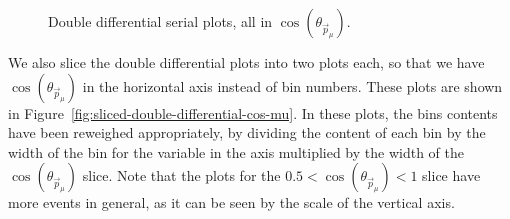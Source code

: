 \documentclass{article}
\begin{document}
\begin{figure}[H]
    \caption{Double differential serial plots, all in $\cos(\theta_{\vec{p}_{\mu}})$.}
    \label{fig:double-differential-cos-mu}
\end{figure}

We also slice the double differential plots into two plots each, so that we have $\cos(\theta_{\vec{p}_{\mu}})$ in the horizontal axis instead of bin numbers. These plots are shown in Figure~\ref{fig:sliced-double-differential-cos-mu}. In these plots, the bins contents have been reweighed appropriately, by dividing the content of each bin by the width of the bin for the variable in the axis multiplied by the width of the $\cos(\theta_{\vec{p}_{\mu}})$ slice. Note that the plots for the $0.5 < \cos(\theta_{\vec{p}_{\mu}}) < 1$ slice have more events in general, as it can be seen by the scale of the vertical axis. 
\end{document}
